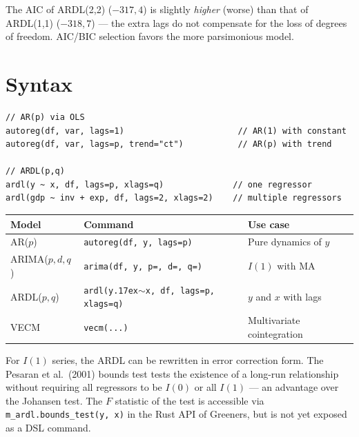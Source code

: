 The AIC of ARDL(2,2) ($-317{,}4$) is slightly \emph{higher} (worse) than that
of ARDL(1,1) ($-318{,}7$) — the extra lags do not compensate for the loss of
degrees of freedom. AIC/BIC selection favors the more parsimonious model.

\section{Syntax}

\begin{lstlisting}
// AR(p) via OLS
autoreg(df, var, lags=1)                       // AR(1) with constant
autoreg(df, var, lags=p, trend="ct")           // AR(p) with trend

// ARDL(p,q)
ardl(y ~ x, df, lags=p, xlags=q)              // one regressor
ardl(gdp ~ inv + exp, df, lags=2, xlags=2)    // multiple regressors
\end{lstlisting}

\begin{center}
\begin{tabular}{lll}
\toprule
\textbf{Model} & \textbf{Command} & \textbf{Use case} \\
\midrule
AR($p$)      & \texttt{autoreg(df, y, lags=p)}       & Pure dynamics of $y$ \\
ARIMA($p,d,q$) & \texttt{arima(df, y, p=, d=, q=)}  & $I(1)$ with MA \\
ARDL($p,q$)  & \texttt{ardl(y{\raise.17ex\hbox{$\scriptstyle\sim$}}x, df, lags=p, xlags=q)} & $y$ and $x$ with lags \\
VECM         & \texttt{vecm(...)}                     & Multivariate cointegration \\
\bottomrule
\end{tabular}
\end{center}

\begin{nota}
  For $I(1)$ series, the ARDL can be rewritten in error correction form.
  The Pesaran et al.\ (2001) bounds test tests the existence of a
  long-run relationship without requiring all regressors to be $I(0)$
  or all $I(1)$ — an advantage over the Johansen test. The $F$ statistic
  of the test is accessible via \texttt{m\_ardl.bounds\_test(y, x)} in the
  Rust API of Greeners, but is not yet exposed as a DSL command.
\end{nota}
